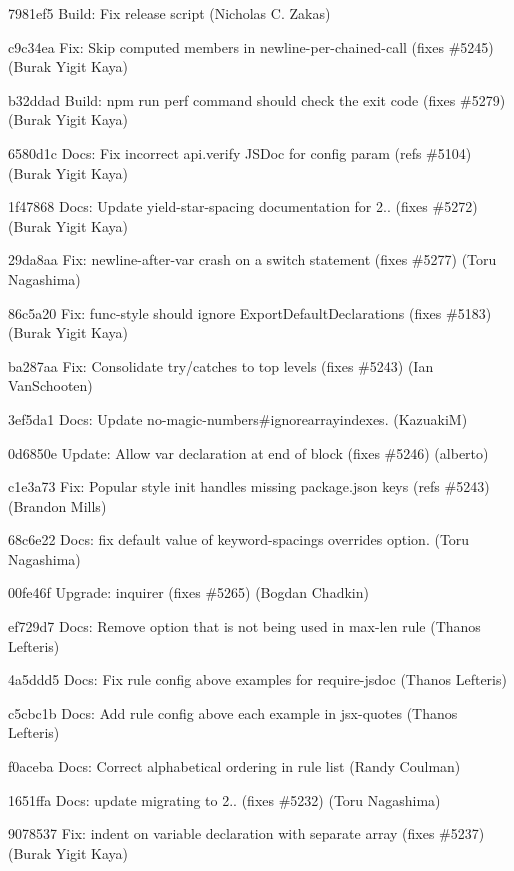 \begin{DoxyItemize}
\item 7981ef5 Build\+: Fix release script (Nicholas C. Zakas)
\item c9c34ea Fix\+: Skip computed members in {\ttfamily newline-\/per-\/chained-\/call} (fixes \#5245) (Burak Yigit Kaya)
\item b32ddad Build\+: {\ttfamily npm run perf} command should check the exit code (fixes \#5279) (Burak Yigit Kaya)
\item 6580d1c Docs\+: Fix incorrect {\ttfamily api.\+verify} J\+S\+Doc for {\ttfamily config} param (refs \#5104) (Burak Yigit Kaya)
\item 1f47868 Docs\+: Update yield-\/star-\/spacing documentation for 2.. (fixes \#5272) (Burak Yigit Kaya)
\item 29da8aa Fix\+: {\ttfamily newline-\/after-\/var} crash on a switch statement (fixes \#5277) (Toru Nagashima)
\item 86c5a20 Fix\+: {\ttfamily func-\/style} should ignore Export\+Default\+Declarations (fixes \#5183) (Burak Yigit Kaya)
\item ba287aa Fix\+: Consolidate try/catches to top levels (fixes \#5243) (Ian Van\+Schooten)
\item 3ef5da1 Docs\+: Update no-\/magic-\/numbers\#ignorearrayindexes. (KazuakiM)
\item 0d6850e Update\+: Allow var declaration at end of block (fixes \#5246) (alberto)
\item c1e3a73 Fix\+: Popular style init handles missing package.\+json keys (refs \#5243) (Brandon Mills)
\item 68c6e22 Docs\+: fix default value of {\ttfamily keyword-\/spacing}\textquotesingle{}s overrides option. (Toru Nagashima)
\item 00fe46f Upgrade\+: inquirer (fixes \#5265) (Bogdan Chadkin)
\item ef729d7 Docs\+: Remove option that is not being used in max-\/len rule (Thanos Lefteris)
\item 4a5ddd5 Docs\+: Fix rule config above examples for require-\/jsdoc (Thanos Lefteris)
\item c5cbc1b Docs\+: Add rule config above each example in jsx-\/quotes (Thanos Lefteris)
\item f0aceba Docs\+: Correct alphabetical ordering in rule list (Randy Coulman)
\item 1651ffa Docs\+: update migrating to 2.. (fixes \#5232) (Toru Nagashima)
\item 9078537 Fix\+: {\ttfamily indent} on variable declaration with separate array (fixes \#5237) (Burak Yigit Kaya)

\end{DoxyItemize}
